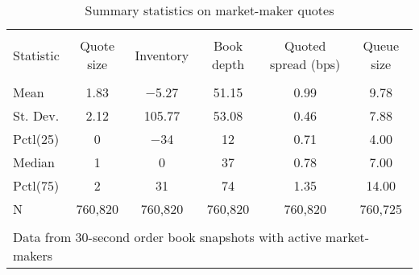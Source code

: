 
\begin{table}[!htbp] \centering 
  \caption{Summary statistics on market-maker quotes} 
  \label{} 
\begin{tabular}{@{\extracolsep{5pt}}lccccc} 
\\[-1.8ex]\hline 
\hline \\[-1.8ex] 
Statistic & Quote size & Inventory & Book depth & Quoted spread (bps) & Queue size \\ 
\hline \\[-1.8ex] 
Mean & 1.83 & $-$5.27 & 51.15 & 0.99 & 9.78 \\ 
St. Dev. & 2.12 & 105.77 & 53.08 & 0.46 & 7.88 \\ 
Pctl(25) & 0 & $-$34 & 12 & 0.71 & 4.00 \\ 
Median & 1 & 0 & 37 & 0.78 & 7.00 \\ 
Pctl(75) & 2 & 31 & 74 & 1.35 & 14.00 \\ 
N & 760,820 & 760,820 & 760,820 & 760,820 & 760,725 \\ 
\hline \\[-1.8ex] 
\multicolumn{6}{l}{Data from 30-second order book snapshots with active market-makers} \\ 
\end{tabular} 
\end{table} 
